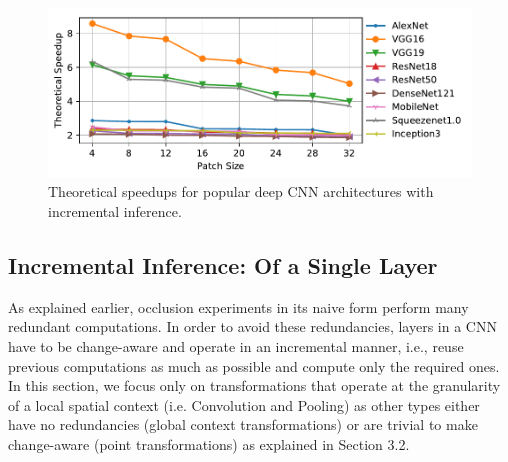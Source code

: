 \begin{figure}[t]
\includegraphics[width=\columnwidth]{images/redundancy_ratio}
\vspace{-4mm}
\caption{Theoretical speedups for popular deep CNN architectures with incremental inference.}
\label{fig:redundancy_ratio}
\end{figure}


\subsection{Incremental Inference: Of a Single Layer}\label{sec:inc_computation}
As explained earlier, occlusion experiments in its naive form perform many redundant computations.
In order to avoid these redundancies, layers in a CNN have to be change-aware and operate in an incremental manner, i.e., reuse previous computations as much as possible and compute only the required ones.
In this section, we focus only on transformations that operate at the granularity of a local spatial context (i.e. Convolution and Pooling) as other types either have no redundancies (global context transformations) or are trivial to make change-aware (point transformations) as explained in Section 3.2.


